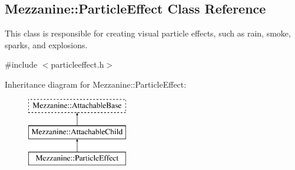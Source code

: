 \hypertarget{classMezzanine_1_1ParticleEffect}{
\subsection{Mezzanine::ParticleEffect Class Reference}
\label{classMezzanine_1_1ParticleEffect}
}


This class is responsible for creating visual particle effects, such as rain, smoke, sparks, and explosions.  




{\ttfamily \#include $<$particleeffect.h$>$}

Inheritance diagram for Mezzanine::ParticleEffect:\begin{figure}[H]
\begin{center}
\leavevmode
\includegraphics[height=3.000000cm]{classMezzanine_1_1ParticleEffect}
\end{center}
\end{figure}
